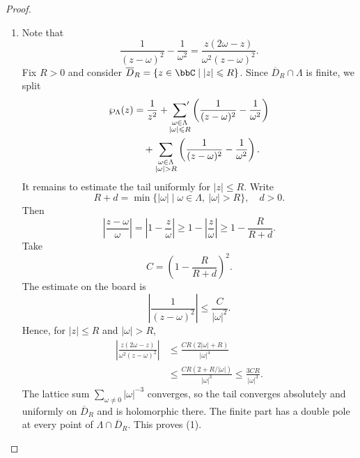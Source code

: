 \begin{proof}
    \leavevmode
    \begin{enumerate}[label=(\arabic*)]
        \item Note that
        \[
            \frac{1}{(z - \omega)^2} - \frac{1}{\omega^2} = \frac{z(2\omega - z)}{\omega^2(z - \omega)^2}.
        \]
        Fix $R > 0$ and consider $\overline D_R = \{z \in \bbC \mid |z| \leqslant R\}$. Since $\overline D_R \cap \Lambda$ is finite, we split
        \[
            \begin{aligned}
                \wp_\Lambda(z) &= \frac{1}{z^2} + \sideset{}{'}\sum_{\substack{\omega \in \Lambda\\|\omega| \leqslant R}}\left(\frac{1}{(z - \omega)^2} - \frac{1}{\omega^2}\right)\\
                &\quad + \sum_{\substack{\omega \in \Lambda\\|\omega| > R}}\left(\frac{1}{(z - \omega)^2} - \frac{1}{\omega^2}\right).
            \end{aligned}
        \]
        It remains to estimate the tail uniformly for $|z| \leqslant R$. Write
        \[
            R + d = \min\{|\omega| \mid \omega \in \Lambda,\ |\omega| > R\}, \quad d > 0.
        \]
        Then
        \[
            \left|\frac{z - \omega}{\omega}\right| = \left|1 - \frac{z}{\omega}\right| \geqslant 1 - \left|\frac{z}{\omega}\right| \geqslant 1 - \frac{R}{R + d}.
        \]
        Take
        \[
            C = \left(1 - \frac{R}{R + d}\right)^2.
        \]
        The estimate on the board is
        \[
            \left|\frac{1}{(z - \omega)^2}\right| \leqslant \frac{C}{|\omega|^2}.
        \]
        Hence, for $|z| \leqslant R$ and $|\omega| > R$,
        \[
            \begin{aligned}
                \left|\frac{z(2\omega - z)}{\omega^2(z - \omega)^2}\right| &\leqslant \frac{CR(2|\omega| + R)}{|\omega|^4}\\
                &\leqslant \frac{CR(2 + R/|\omega|)}{|\omega|^3} \leqslant \frac{3CR}{|\omega|^3}.
            \end{aligned}
        \]
        The lattice sum $\sum_{\omega \neq 0}|\omega|^{-3}$ converges, so the tail converges absolutely and uniformly on $\overline D_R$ and is holomorphic there. The finite part has a double pole at every point of $\Lambda \cap \overline D_R$. This proves (1).


\end{enumerate}
\end{proof}
